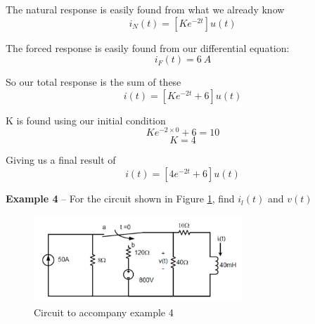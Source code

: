 \documentclass{handout}
\begin{document}
{The natural response is easily found from what we already know
\[
i_N(t) = \left[Ke^{-2t}\right]u(t)
\]

The forced response is easily found from our differential equation:
\[
i_F(t) = 6\ A
\]

So our total response is the sum of these
\[
i(t) = \left[Ke^{-2t} + 6\right]u(t)
\]

K is found using our initial condition
\[
Ke^{-2 \times 0} + 6 =10
\]
\[
K=4
\]

Giving us a final result of
\[
i(t) = \left[4e^{-2t} + 6\right]u(t)
\]
}

\newpage
\clearpage
\pagebreak

\textbf{Example 4} -- For the circuit shown in Figure \ref{fig: Example4}, find $i_l(t)$ and $v(t)$

\begin{figure} [h!]
\centering
\includegraphics[width=0.7\textwidth]{Example4.jpg}
\caption{Circuit to accompany example 4}
\label{fig: Example4}
\end{figure}

\end{document}
